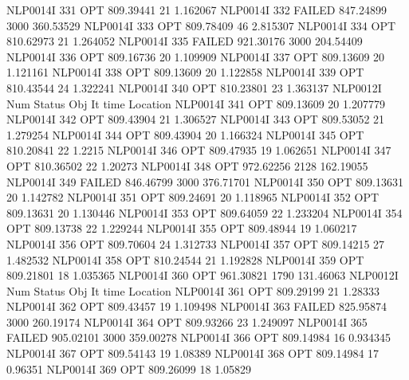 NLP0014I           331         OPT 809.39441       21 1.162067
NLP0014I           332      FAILED 847.24899     3000 360.53529
NLP0014I           333         OPT 809.78409       46 2.815307
NLP0014I           334         OPT 810.62973       21 1.264052
NLP0014I           335      FAILED 921.30176     3000 204.54409
NLP0014I           336         OPT 809.16736       20 1.109909
NLP0014I           337         OPT 809.13609       20 1.121161
NLP0014I           338         OPT 809.13609       20 1.122858
NLP0014I           339         OPT 810.43544       24 1.322241
NLP0014I           340         OPT 810.23801       23 1.363137
NLP0012I 
              Num      Status      Obj             It       time                 Location
NLP0014I           341         OPT 809.13609       20 1.207779
NLP0014I           342         OPT 809.43904       21 1.306527
NLP0014I           343         OPT 809.53052       21 1.279254
NLP0014I           344         OPT 809.43904       20 1.166324
NLP0014I           345         OPT 810.20841       22 1.2215
NLP0014I           346         OPT 809.47935       19 1.062651
NLP0014I           347         OPT 810.36502       22 1.20273
NLP0014I           348         OPT 972.62256     2128 162.19055
NLP0014I           349      FAILED 846.46799     3000 376.71701
NLP0014I           350         OPT 809.13631       20 1.142782
NLP0014I           351         OPT 809.24691       20 1.118965
NLP0014I           352         OPT 809.13631       20 1.130446
NLP0014I           353         OPT 809.64059       22 1.233204
NLP0014I           354         OPT 809.13738       22 1.229244
NLP0014I           355         OPT 809.48944       19 1.060217
NLP0014I           356         OPT 809.70604       24 1.312733
NLP0014I           357         OPT 809.14215       27 1.482532
NLP0014I           358         OPT 810.24544       21 1.192828
NLP0014I           359         OPT 809.21801       18 1.035365
NLP0014I           360         OPT 961.30821     1790 131.46063
NLP0012I 
              Num      Status      Obj             It       time                 Location
NLP0014I           361         OPT 809.29199       21 1.28333
NLP0014I           362         OPT 809.43457       19 1.109498
NLP0014I           363      FAILED 825.95874     3000 260.19174
NLP0014I           364         OPT 809.93266       23 1.249097
NLP0014I           365      FAILED 905.02101     3000 359.00278
NLP0014I           366         OPT 809.14984       16 0.934345
NLP0014I           367         OPT 809.54143       19 1.08389
NLP0014I           368         OPT 809.14984       17 0.96351
NLP0014I           369         OPT 809.26099       18 1.05829
